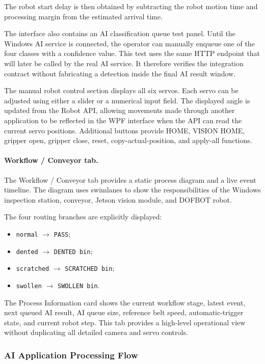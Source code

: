 The robot start delay is then obtained by subtracting the robot motion time and processing margin from the estimated arrival time.

The interface also contains an AI classification queue test panel. Until the Windows AI service is connected, the operator can manually enqueue one of the four classes with a confidence value. This test uses the same HTTP endpoint that will later be called by the real AI service. It therefore verifies the integration contract without fabricating a detection inside the final AI result window.

The manual robot control section displays all six servos. Each servo can be adjusted using either a slider or a numerical input field. The displayed angle is updated from the Robot API, allowing movements made through another application to be reflected in the WPF interface when the API can read the current servo positions. Additional buttons provide HOME, VISION HOME, gripper open, gripper close, reset, copy-actual-position, and apply-all functions.

\paragraph{Workflow / Conveyor tab.}
The Workflow / Conveyor tab provides a static process diagram and a live event timeline. The diagram uses swimlanes to show the responsibilities of the Windows inspection station, conveyor, Jetson vision module, and DOFBOT robot.

The four routing branches are explicitly displayed:

\begin{itemize}
    \item \texttt{normal} $\rightarrow$ \texttt{PASS};
    \item \texttt{dented} $\rightarrow$ \texttt{DENTED bin};
    \item \texttt{scratched} $\rightarrow$ \texttt{SCRATCHED bin};
    \item \texttt{swollen} $\rightarrow$ \texttt{SWOLLEN bin}.
\end{itemize}

The Process Information card shows the current workflow stage, latest event, next queued AI result, AI queue size, reference belt speed, automatic-trigger state, and current robot step. This tab provides a high-level operational view without duplicating all detailed camera and servo controls.


\subsubsection{AI Application Processing Flow}
\label{sec:ai-processing-flow}

